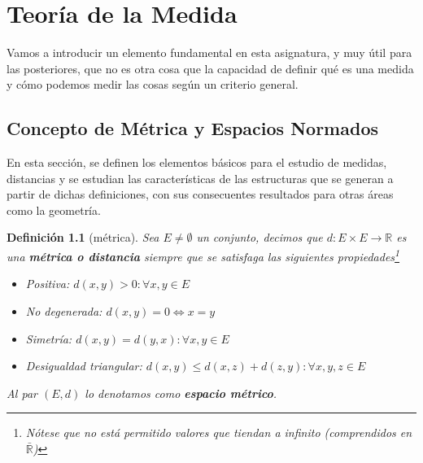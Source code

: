 \documentclass[10pt,a4paper,openright]{book}
\theoremstyle{break}
\newtheorem*{defi}{Definición}
\begin{document}
\mainmatter
\hypersetup{linkcolor=black} %
\setcounter{tocdepth}{3}%
\setcounter{secnumdepth}{4}%
\tableofcontents
\hypersetup{linkcolor=blue} %

\chapter{Teoría de la Medida}
Vamos a introducir un elemento fundamental en esta asignatura, y muy útil para las posteriores, que no es otra cosa que la capacidad de definir qué es una medida y cómo podemos medir las cosas según un criterio general.

\section{Concepto de Métrica y Espacios Normados}
En esta sección, se definen los elementos básicos para el estudio de medidas, distancias y se estudian las características de las estructuras que se generan a partir de dichas definiciones, con sus consecuentes resultados para otras áreas como la geometría.

\begin{defi}[métrica]
Sea $E\neq \emptyset$ un conjunto, decimos que $d: E\times E \rightarrow \mathbb R$ es una \textbf{métrica o distancia} siempre que se satisfaga las siguientes propiedades\footnote{Nótese que no está permitido valores que tiendan a infinito (comprendidos en $\bar{\mathbb R}$)}
\begin{itemize}
\item Positiva: $d(x,y)>0: \forall x, y \in E$
\item No degenerada: $d(x,y) = 0 \Leftrightarrow x = y$
\item Simetría: $d(x,y) = d(y,x): \forall x,y \in E$
\item Desigualdad triangular: $d(x,y)\leq d(x,z)+ d(z,y): \forall x,y,z\in E$
\end{itemize}

Al par $(E,d)$ lo denotamos como \textbf{espacio métrico}.

\end{defi}
\end{document}
